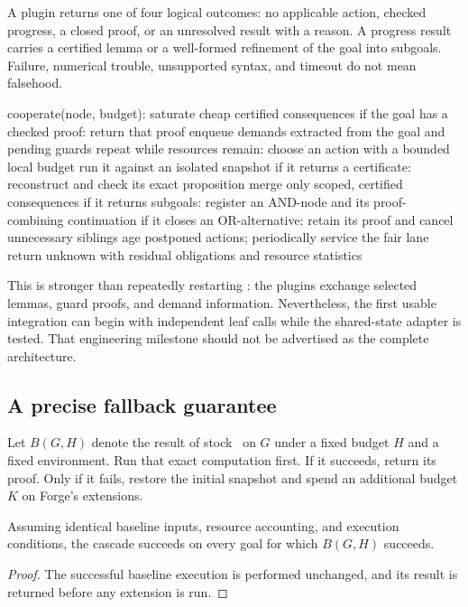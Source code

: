 A plugin returns one of four logical outcomes: no applicable action, checked
progress, a closed proof, or an unresolved result with a reason. A progress
result carries a certified lemma or a well-formed refinement of the goal into
subgoals. Failure, numerical trouble, unsupported syntax, and timeout do not
mean falsehood.

\begin{Code}
cooperate(node, budget):
  saturate cheap certified consequences
  if the goal has a checked proof: return that proof
  enqueue demands extracted from the goal and pending guards
  repeat while resources remain:
    choose an action with a bounded local budget
    run it against an isolated snapshot
    if it returns a certificate:
      reconstruct and check its exact proposition
      merge only scoped, certified consequences
    if it returns subgoals:
      register an AND-node and its proof-combining continuation
    if it closes an OR-alternative:
      retain its proof and cancel unnecessary siblings
    age postponed actions; periodically service the fair lane
  return unknown with residual obligations and resource statistics
\end{Code}

This is stronger than repeatedly restarting : the plugins exchange selected lemmas, guard proofs, and demand
information. Nevertheless, the first usable integration can begin with
independent leaf calls while the shared-state adapter is tested. That
engineering milestone should not be advertised as the complete architecture.

\subsection{A precise fallback guarantee}

Let $B(G,H)$ denote the result of stock \grind\ on $G$ under a fixed budget
$H$ and a fixed environment. Run that exact computation first. If it succeeds,
return its proof. Only if it fails, restore the initial snapshot and spend an
additional budget $K$ on Forge's extensions.

\begin{proposition}
Assuming identical baseline inputs, resource accounting, and execution
conditions, the cascade succeeds on every goal for which $B(G,H)$ succeeds.
\end{proposition}
\begin{proof}
The successful baseline execution is performed unchanged, and its result is
returned before any extension is run.
\end{proof}

